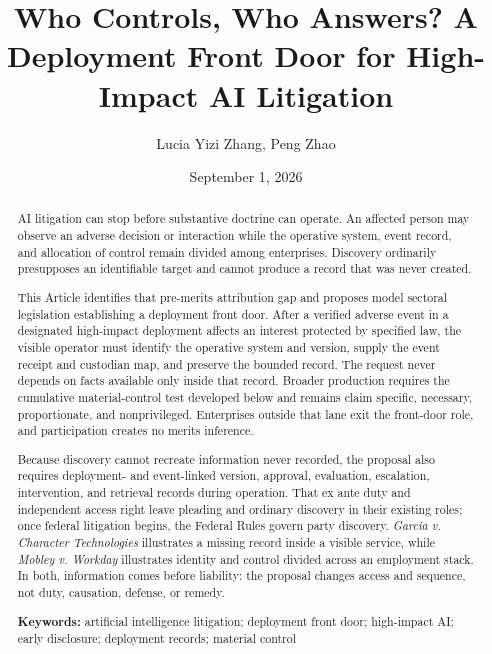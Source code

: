 \documentclass[review=harvardjolt,mode=final,twoside]{americanlawreview}
\title{Who Controls, Who Answers? A Deployment Front Door for High-Impact AI Litigation}
\author{Lucia Yizi Zhang, Peng Zhao}
\date{September 1, 2026}
\begin{document}
\maketitle

\begin{abstract}
AI litigation can stop before substantive doctrine can operate. An affected person may observe an adverse decision or interaction while the operative system, event record, and allocation of control remain divided among enterprises. Discovery ordinarily presupposes an identifiable target and cannot produce a record that was never created.

This Article identifies that pre-merits attribution gap and proposes model sectoral legislation establishing a deployment front door. After a verified adverse event in a designated high-impact deployment affects an interest protected by specified law, the visible operator must identify the operative system and version, supply the event receipt and custodian map, and preserve the bounded record. The request never depends on facts available only inside that record. Broader production requires the cumulative material-control test developed below and remains claim specific, necessary, proportionate, and nonprivileged. Enterprises outside that lane exit the front-door role, and participation creates no merits inference.

Because discovery cannot recreate information never recorded, the proposal also requires deployment- and event-linked version, approval, evaluation, escalation, intervention, and retrieval records during operation. That ex ante duty and independent access right leave pleading and ordinary discovery in their existing roles; once federal litigation begins, the Federal Rules govern party discovery. \emph{Garcia v. Character Technologies} illustrates a missing record inside a visible service, while \emph{Mobley v. Workday} illustrates identity and control divided across an employment stack. In both, information comes before liability: the proposal changes access and sequence, not duty, causation, defense, or remedy.

\noindent\textbf{Keywords:} artificial intelligence litigation; deployment front door; high-impact AI; early disclosure; deployment records; material control
\end{abstract}

\tableofcontents








\end{document}
